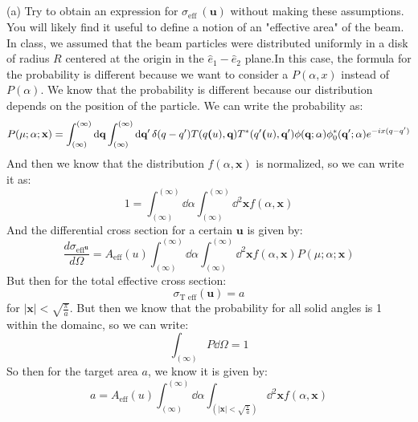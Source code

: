 \documentclass[12pt]{article}
\begin{document}
\subsection{}
(a) Try to obtain an expression for $\sigma_{\text {eff }}(\mathbf{u})$ without making these assumptions. You will likely find it useful to define a notion of an "effective area" of the beam.\\
In class, we assumed that the beam particles were distributed uniformly in a disk of radius $R$ centered at the origin in the $\hat{e}_{1}-\hat{e}_{2}$ plane.In this case, the formula for the probability is different because we want to consider a $P(\alpha , x)$ instead of $P(\alpha )$. We know that the probability is different because our distribution depends on the position of the particle. We can write the probability as:
\begin{equation}
P(\mu ; \alpha ; \mathbf{x}) = \int_{(\infty)}^{(\infty)} \dd{\textbf{q}}\int_{(\infty)}^{(\infty)} \dd{\textbf{q}^{\prime}} \delta(q-q^{\prime}) T(q\textbf(u), \textbf{q})T^*(q^{\prime}\textbf(u), \textbf{q}^{\prime}) \phi(\textbf{q}; \alpha) \phi_0^*(\textbf{q}^{\prime}; \alpha) e^{-ix(q-q^{\prime})}
\end{equation}
And then we know that the distribution $f(\alpha, \textbf{x})$ is normalized, so we can write it as:
\begin{equation}
1 = \int_{(\infty)}^{(\infty)} \dd{\alpha} \int_{(\infty)}^{(\infty)} \dd^2{\textbf{x}} f(\alpha, \textbf{x})
\end{equation}
And the differential cross section for a certain $\textbf{u}$ is given by:
\begin{equation}
\frac{d\sigma_{\text{eff}^{\textbf{u}}}}{d\Omega} = A_{\text{eff}}(u) \int_{(\infty)}^{(\infty)} \dd{\alpha} \int_{(\infty)}^{(\infty)} \dd^2{\textbf{x}} f(\alpha, \textbf{x}) P(\mu ; \alpha ; \mathbf{x})
\end{equation}
But then for the total effective cross section:
\begin{equation}
\sigma_{\text{T eff}}(\textbf{u}) = a
\end{equation}
for $|\textbf{x}| < \sqrt{\frac{\pi}{a}}$. But then we know that the probability for all solid angles is 1 within the domainc, so we can write:
\begin{equation}
\int_{(\infty)} P \dd{\Omega} = 1
\end{equation}
So then for the target area $a$, we know it is given by:
\begin{equation}
a = A_{\text{eff}}(u) \int_{(\infty)}^{(\infty)} \dd{\alpha} \int_{(|\textbf{x}| < \sqrt{\frac{\pi}{a}})} \dd^2{\textbf{x}} f(\alpha, \textbf{x})
\end{equation}
\end{document}
